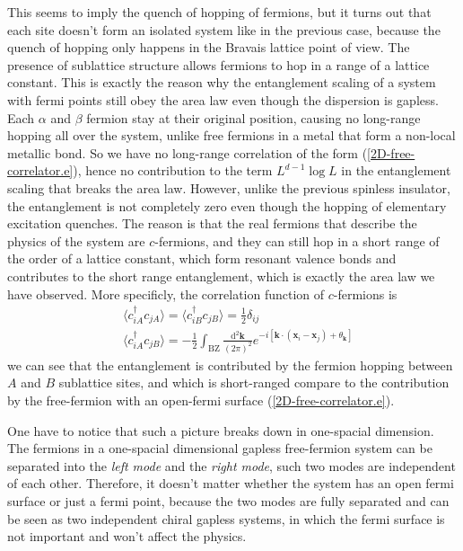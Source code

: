 \documentclass[12font]{article}
\theoremstyle{definition}
\numberwithin{equation}{section}
\newcommand{\anglelr}[1]{\langle #1 \rangle}
\newcommand{\llr}[1]{(  #1  )}
\newcommand{\llrm}[1]{[  #1  ]}
\newcommand{\mrm}[1]{\mathrm{#1}}
\newcommand{\bo}[1]{\mathbf{#1}}
\begin{document}
This seems to imply the quench of hopping of fermions, but it turns out that each site doesn't form an isolated system like in the previous case, because the quench of hopping only happens in the Bravais lattice point of view. The presence of sublattice structure allows fermions to hop in a range of a lattice constant. This is exactly the reason why the entanglement scaling of a system with fermi points still obey the area law even though the dispersion is gapless. Each $\alpha$ and $\beta$ fermion stay at their original position, causing no long-range hopping all over the system, unlike free fermions in a metal that form a non-local metallic bond. So we have no long-range correlation of the form (\ref{2D-free-correlator.e}), hence no contribution to the term $L^{d-1}\log L$ in the entanglement scaling that breaks the area law. However, unlike the previous spinless insulator, the entanglement is not completely zero even though the hopping of elementary excitation quenches. The reason is that the real fermions that describe the physics of the system are $c$-fermions, and they can still hop in a short range of the order of a lattice constant, which form resonant valence bonds and contributes to the short range entanglement, which is exactly the area law we have observed. More specificly, the correlation function of $c$-fermions is
\[
\begin{aligned}
& \anglelr{c^\dagger_{iA}c_{jA}} = \anglelr{c^\dagger_{iB}c_{jB}} = \frac{1}{2}\delta_{ij} \\
& \anglelr{c^\dagger_{iA}c_{jB}} = -\frac{1}{2}\int_{\mrm{BZ}}\frac{\mrm{d}^2\bo{k}}{\llr{2\pi}^2} e^{-i\llrm{\bo{k}\cdot\llr{\bo{x}_i-\bo{x}_j} + \theta_\bo{k}}}
\end{aligned}
\]
we can see that the entanglement is contributed by the fermion hopping between $A$ and $B$ sublattice sites, and which is short-ranged compare to the contribution by the free-fermion with an open-fermi surface (\ref{2D-free-correlator.e}).

One have to notice that such a picture breaks down in one-spacial dimension. The fermions in a one-spacial dimensional gapless free-fermion system can be separated into the \emph{left mode} and the \emph{right mode}, such two modes are independent of each other. Therefore, it doesn't matter whether the system has an open fermi surface or just a fermi point, because the two modes are fully separated and can be seen as two independent chiral gapless systems, in which the fermi surface is not important and won't affect the physics.
\end{document}
